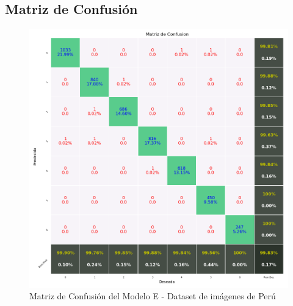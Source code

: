 	 	\subsection{Matriz de Confusión}  
			\begin{figure}[H]
				\begin{center}
				\includegraphics[width=1\textwidth, height=11.2cm,keepaspectratio]{images/desarrollo/testResults/peru/modelE} 
				\end{center}
				\begin{center}
				\caption{\small{Matriz de Confusión del Modelo E - Dataset de imágenes de Perú}}
				
				{\small{\fontsize{10}{16.8}\selectfont {Fuente propia}}}
				\end{center}
				\vspace{-1.5em}
			\end{figure}
